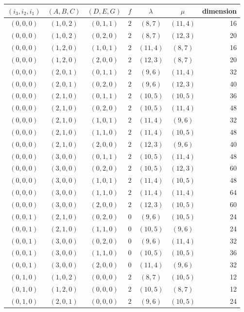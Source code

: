 \begin{center}\small
\begin{tabular}{ccccccr}
\toprule
$(i_3,i_2,i_1)$ & $(A,B,C)$ & $(D,E,G)$ & $f$ & $\lambda$ & $\mu$ & dimension\\
\midrule
$(0,0,0)$ & $(1,0,2)$ & $(0,1,1)$ & $2$ & $(8,7)$ & $(11,4)$ & 16\\
$(0,0,0)$ & $(1,0,2)$ & $(0,2,0)$ & $2$ & $(8,7)$ & $(12,3)$ & 20\\
$(0,0,0)$ & $(1,2,0)$ & $(1,0,1)$ & $2$ & $(11,4)$ & $(8,7)$ & 16\\
$(0,0,0)$ & $(1,2,0)$ & $(2,0,0)$ & $2$ & $(12,3)$ & $(8,7)$ & 20\\
$(0,0,0)$ & $(2,0,1)$ & $(0,1,1)$ & $2$ & $(9,6)$ & $(11,4)$ & 32\\
$(0,0,0)$ & $(2,0,1)$ & $(0,2,0)$ & $2$ & $(9,6)$ & $(12,3)$ & 40\\
$(0,0,0)$ & $(2,1,0)$ & $(0,1,1)$ & $2$ & $(10,5)$ & $(10,5)$ & 36\\
$(0,0,0)$ & $(2,1,0)$ & $(0,2,0)$ & $2$ & $(10,5)$ & $(11,4)$ & 48\\
$(0,0,0)$ & $(2,1,0)$ & $(1,0,1)$ & $2$ & $(11,4)$ & $(9,6)$ & 32\\
$(0,0,0)$ & $(2,1,0)$ & $(1,1,0)$ & $2$ & $(11,4)$ & $(10,5)$ & 48\\
$(0,0,0)$ & $(2,1,0)$ & $(2,0,0)$ & $2$ & $(12,3)$ & $(9,6)$ & 40\\
$(0,0,0)$ & $(3,0,0)$ & $(0,1,1)$ & $2$ & $(10,5)$ & $(11,4)$ & 48\\
$(0,0,0)$ & $(3,0,0)$ & $(0,2,0)$ & $2$ & $(10,5)$ & $(12,3)$ & 60\\
$(0,0,0)$ & $(3,0,0)$ & $(1,0,1)$ & $2$ & $(11,4)$ & $(10,5)$ & 48\\
$(0,0,0)$ & $(3,0,0)$ & $(1,1,0)$ & $2$ & $(11,4)$ & $(11,4)$ & 64\\
$(0,0,0)$ & $(3,0,0)$ & $(2,0,0)$ & $2$ & $(12,3)$ & $(10,5)$ & 60\\
$(0,0,1)$ & $(2,1,0)$ & $(0,2,0)$ & $0$ & $(9,6)$ & $(10,5)$ & 24\\
$(0,0,1)$ & $(2,1,0)$ & $(1,1,0)$ & $0$ & $(10,5)$ & $(9,6)$ & 24\\
$(0,0,1)$ & $(3,0,0)$ & $(0,2,0)$ & $0$ & $(9,6)$ & $(11,4)$ & 32\\
$(0,0,1)$ & $(3,0,0)$ & $(1,1,0)$ & $0$ & $(10,5)$ & $(10,5)$ & 36\\
$(0,0,1)$ & $(3,0,0)$ & $(2,0,0)$ & $0$ & $(11,4)$ & $(9,6)$ & 32\\
$(0,1,0)$ & $(1,0,2)$ & $(0,0,0)$ & $2$ & $(8,7)$ & $(10,5)$ & 12\\
$(0,1,0)$ & $(1,2,0)$ & $(0,0,0)$ & $2$ & $(10,5)$ & $(8,7)$ & 12\\
$(0,1,0)$ & $(2,0,1)$ & $(0,0,0)$ & $2$ & $(9,6)$ & $(10,5)$ & 24\\
\bottomrule
\end{tabular}
\end{center}

